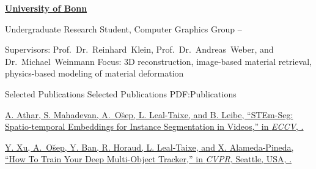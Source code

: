 \documentclass[letterpaper,MMMyyyy,nonstopmode]{simpleresumecv}
\begin{document}
\begin{Body}
\Gap
\Entry
\href{https://www.uni-bonn.de/}
{\textbf{University of Bonn}}
%

\Gap
\BulletItem
Undergraduate Research Student, Computer Graphics Group
\hfill
{} --
\begin{Detail}
\SubBulletItem
Supervisors: 
Prof.~Dr.~Reinhard~Klein, 
Prof.~Dr.~Andreas~Weber, and 
Dr.~Michael~Weinmann
\SubBulletItem
Focus:
3D reconstruction, image-based material retrieval, physics-based modeling of material deformation
\end{Detail}


\Section
{Selected Publications}
{Selected Publications}
{PDF:Publications}

%
%
%
\begingroup

\Gap
\href{https://arxiv.org/pdf/2003.08429.pdf}
{A. Athar, S. Mahadevan, \underline{A.~O\u{s}ep}, L. Leal-Taixe, and B. Leibe,
``STEm-Seg: Spatio-temporal Embeddings for Instance Segmentation in Videos,'' in \textit{ECCV},
.}

\Gap
\href{https://arxiv.org/pdf/1906.06618.pdf}
{Y. Xu, \underline{A.~O\u{s}ep}, Y. Ban, R. Horaud, L. Leal-Taixe, and X. Alameda-Pineda,
``How To Train Your Deep Multi-Object Tracker,''
in \textit{CVPR},
Seattle, USA,
.}


\end{Body}
\end{document}
